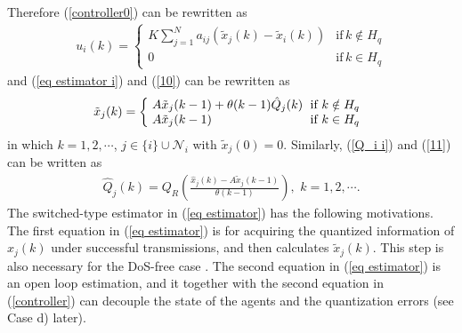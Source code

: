 \documentclass[letterpaper,journal,final,twocolumn]{IEEEtran}
\begin{document}
Therefore (\ref{controller0}) can be rewritten as
\begin{align}\label{controller}
u_i(k) = 
\left\{
\begin{array}{ll}
K \sum_{j=1} ^{N} a_{ij} (\tilde x_j   (k) - \tilde x_i   (k)) &\text{if}\,k \notin H_q \\
0 & \text{if}\, k \in H_q
\end{array}
\right.
\end{align}
and (\ref{eq estimator i}) and (\ref{10}) can be rewritten as
\begin{eqnarray}\setlength{\arraycolsep}{3pt}  \label{eq estimator}
\tilde x_j (k)
=
\left\{
\begin{array}{ll}
A  \tilde x_j(k-1) + \theta(k-1) \hat Q_j(k)  & \text{if $k \notin H_q$ } \\
A\tilde x_j(k-1)               & \text{if $k \in  H_q$} 
\end{array}
\right.
\end{eqnarray}
in which $k=1, 2, \cdots$, $j\in\{i\}\cup\mathcal{N}_i$ with $\tilde x_j (0)=    0$. Similarly, (\ref{Q_i i}) and (\ref{11}) can be written as 
\begin{eqnarray}\label{Q_i} 
\hat  Q_j (k) = Q_R \left(\frac{\hat x_j(k) -  A \tilde x_j(k-1)}{\theta(k-1)}  \right), \,\, k=1, 2, \cdots.
\end{eqnarray}
The switched-type estimator in (\ref{eq estimator}) has the following motivations. The first equation in (\ref{eq estimator}) is for acquiring the quantized information of $\hat x_j (k)$ under successful transmissions, and then calculates $\tilde x_j (k)$. This step is also necessary for the DoS-free case \cite{you2011network}. The second equation in (\ref{eq estimator}) is an open loop estimation, and it together with the second equation in (\ref{controller}) can decouple the state of the agents and the quantization errors (see Case d) later). 
\end{document}
